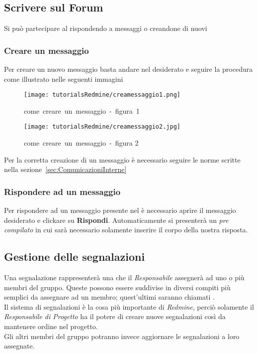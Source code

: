 \documentclass{scalatekids-article}
\begin{document}
\subsection{Scrivere sul Forum}

Si può partecipare al  rispondendo a messaggi o creandone di nuovi

\subsubsection{Creare un messaggio}

Per creare un nuovo messaggio basta andare nel  desiderato e seguire la procedura come illustrato nelle seguenti immagini
\begin{figure}[H]
    \centering
    \texttt{[image: tutorialsRedmine/creamessaggio1.png]}
    \caption{come\ creare\ un\ messaggio\ -\ figura\ 1}
\end{figure}
\begin{figure}[H]
    \centering
    \texttt{[image: tutorialsRedmine/creamessaggio2.jpg]}
    \caption{come\ creare\ un\ messaggio\ -\ figura 2}
\end{figure}
Per la corretta creazione di un messaggio è necessario seguire le norme scritte nella sezione~\ref{sec:ComunicazioniInterne}

\subsubsection{Rispondere ad un messaggio}

Per rispondere ad un messaggio presente nel  è necessario aprire il messaggio desiderato e clickare su \textbf{Rispondi}. Automaticamente si presenterà un  \textit{pre compilato} in cui sarà necessario solamente inserire il corpo della nostra risposta.

\subsection{Gestione delle segnalazioni}

Una segnalazione rappresenterà una  che il \textit{Responsabile} assegnerà ad uno o più membri del gruppo. Queste  possono essere suddivise in diversi compiti più semplici da assegnare ad un membro; quest'ultimi saranno chiamati .\\
Il sistema di segnalazioni è la cosa più importante di \textit{Redmine}, perciò solamente il \textit{Responsabile di Progetto} ha il potere di creare nuove segnalazioni così da mantenere ordine nel progetto. \\Gli altri membri del gruppo potranno invece aggiornare le segnalazioni a loro assegnate.
\end{document}

